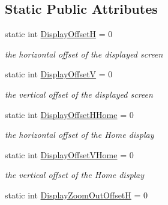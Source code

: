 \subsection*{Static Public Attributes}
\begin{DoxyCompactItemize}
\item 
\mbox{\label{class_t_display_a9a9f37c50df125f2543f251460caf841}} 
static int \mbox{\hyperlink{class_t_display_a9a9f37c50df125f2543f251460caf841}{Display\+OffsetH}} = 0
\begin{DoxyCompactList}\small\item\em the horizontal offset of the displayed screen \end{DoxyCompactList}\item 
\mbox{\label{class_t_display_a6f11e4ccff893eef6ab624a7430974c3}} 
static int \mbox{\hyperlink{class_t_display_a6f11e4ccff893eef6ab624a7430974c3}{Display\+OffsetV}} = 0
\begin{DoxyCompactList}\small\item\em the vertical offset of the displayed screen \end{DoxyCompactList}\item 
\mbox{\label{class_t_display_aef050e7f3b440542a12bbccd27bcd99d}} 
static int \mbox{\hyperlink{class_t_display_aef050e7f3b440542a12bbccd27bcd99d}{Display\+Offset\+H\+Home}} = 0
\begin{DoxyCompactList}\small\item\em the horizontal offset of the \textquotesingle{}Home\textquotesingle{} display \end{DoxyCompactList}\item 
\mbox{\label{class_t_display_a4ea243ff377fcc09d3da53dbb2b18dfe}} 
static int \mbox{\hyperlink{class_t_display_a4ea243ff377fcc09d3da53dbb2b18dfe}{Display\+Offset\+V\+Home}} = 0
\begin{DoxyCompactList}\small\item\em the vertical offset of the \textquotesingle{}Home\textquotesingle{} display \end{DoxyCompactList}\item 
\mbox{\label{class_t_display_aa26d2bf6d6d14ad1c853f81f06f25121}} 
static int \mbox{\hyperlink{class_t_display_aa26d2bf6d6d14ad1c853f81f06f25121}{Display\+Zoom\+Out\+OffsetH}} = 0

\end{DoxyCompactItemize}

